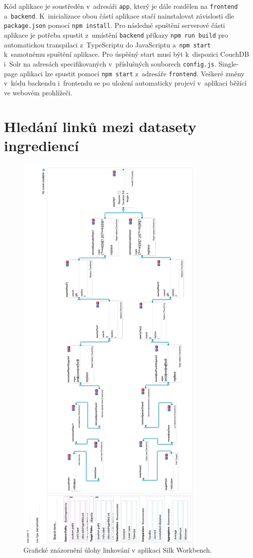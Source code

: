 \documentclass[12pt,a4paper]{report}
\let\openright=\clearpage
\begin{document}
Kód aplikace je soustředěn v~adresáři \texttt{app}, který je dále rozdělen na \texttt{frontend} a~\texttt{backend}. K~inicializace obou částí aplikace stačí nainstalovat závislosti dle \texttt{package.json} pomocí \texttt{npm\,install}. Pro následné spuštění serverové části aplikace je potřeba spustit z~umístění \texttt{backend} příkazy \texttt{npm\,run\,build} pro automatickou transpilaci z~TypeScriptu do JavaScriptu a~\texttt{npm\,start} k~samotnému spuštění aplikace. Pro úspěšný start musí být k~dispozici CouchDB i~Solr na adresách specifikovaných v~příslušných souborech \texttt{config.js}. Single-page aplikaci lze spustit pomocí \texttt{npm\,start} z~adresáře \texttt{frontend}. Veškeré změny v~kódu backendu i~frontendu se po uložení automaticky projeví v~aplikaci běžící ve webovém prohlížeči.

\pagebreak
\section{Hledání linků mezi datasety ingrediencí}

\begin{figure}[h!]\centering
\includegraphics[height=205mm]{../img/silk-workbench}
\caption{Grafické znázornění úlohy linkování v aplikaci Silk Workbench.}
\label{obr0a:silk-workbench}
\end{figure}

\openright
\end{document}
